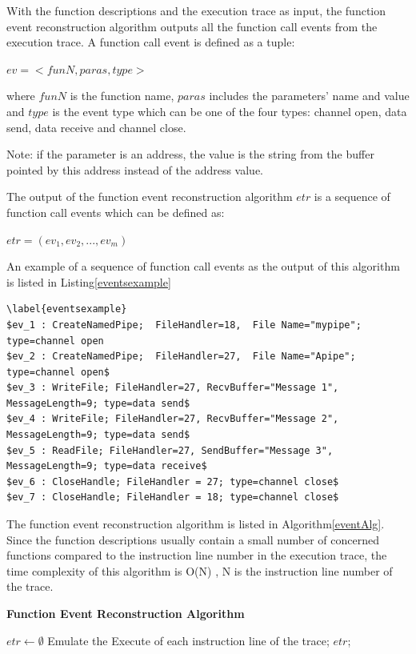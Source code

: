 With the function descriptions and the execution trace as input, the function event reconstruction algorithm outputs all the function call events from the execution trace. A function call event is defined as a tuple:

$ev = <funN, paras, type>$

where $funN$ is the function name, $paras$ includes the parameters' name and value and $type$ is the event type which can be one of the four types: channel open, data send, data receive and channel close.

Note: if the parameter is an address, the value is the string from the buffer pointed by this address instead of the address value.

The output of the function event reconstruction algorithm $etr$ is a sequence of function call events which can be defined as:

$etr = (ev_1, ev_2, ..., ev_m)$

An example of a sequence of function call events as the output of this algorithm is listed in Listing\ref{eventsexample}

\begin{lstlisting}[caption= Example of  $etr$]
\label{eventsexample}
$ev_1 : CreateNamedPipe;  FileHandler=18,  File Name="mypipe"; type=channel open
$ev_2 : CreateNamedPipe;  FileHandler=27,  File Name="Apipe"; type=channel open$
$ev_3 : WriteFile; FileHandler=27, RecvBuffer="Message 1", MessageLength=9; type=data send$
$ev_4 : WriteFile; FileHandler=27, RecvBuffer="Message 2", MessageLength=9; type=data send$
$ev_5 : ReadFile; FileHandler=27, SendBuffer="Message 3", MessageLength=9; type=data receive$
$ev_6 : CloseHandle; FileHandler = 27; type=channel close$
$ev_7 : CloseHandle; FileHandler = 18; type=channel close$
\end{lstlisting}

The function event reconstruction algorithm is listed in Algorithm\ref{eventAlg}. Since the function descriptions usually contain a  small number of concerned functions compared to the instruction line number in the execution trace, the time complexity of this algorithm is O(N) , N is the instruction line number of the trace.

\begin{algorithm}[H]
\DontPrintSemicolon
\caption{{\bf Function Event Reconstruction Algorithm} \label{eventAlg}}
$etr \leftarrow \emptyset$\; 
Emulate the Execute of each instruction line of the trace;\;
\KwRet $etr$;\;
\end{algorithm} 


